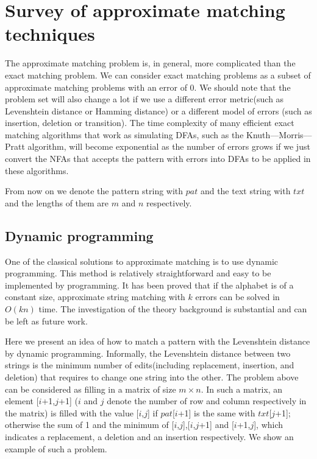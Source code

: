 \section{Survey of approximate matching techniques}
The approximate matching problem is, in general, more complicated than the exact matching problem. We can consider exact matching problems as a subset of approximate matching problems with an error of 0. We should note that the problem set will also change a lot if we use a different error metric(such as Levenshtein distance or Hamming distance) or a different model of errors (such as insertion, deletion or transition). The time complexity of many efficient exact matching algorithms that work as simulating DFAs, such as the Knuth--–Morris--–Pratt algorithm, will become exponential as the number of errors grows if we just convert the NFAs that accepts the pattern with errors into DFAs to be applied in these algorithms. 

From now on we denote the pattern string with $pat$ and the text string with $txt$ and the lengths of them are $m$ and $n$ respectively.

\subsection{Dynamic programming}

One of the classical solutions to approximate matching is to use dynamic programming. This method is relatively straightforward and easy to be implemented by programming. It has been proved that if the alphabet is of a constant size, approximate string matching with $k$ errors can be solved in $O(kn)$ time\cite{crochemore-jewels}. The investigation of the theory background is substantial and can be left as future work.

Here we present an idea of how to match a pattern with the Levenshtein distance by dynamic programming. Informally, the Levenshtein distance between two strings is the minimum number of edits(including replacement, insertion, and deletion) that requires to change one string into the other. The problem above can be considered as filling in a matrix of size $m\times n$. In such a matrix, an element [$i$+1,$j$+1] ($i$ and $j$ denote the number of row and column respectively in the matrix) is filled with the value [$i$,$j$] if $pat$[$i$+1] is the same with $txt$[$j$+1]; otherwise the sum of 1 and the minimum of [$i$,$j$],[$i$,$j$+1] and [$i$+1,$j$], which indicates a replacement, a deletion and an insertion respectively. We show an example of such a problem.


